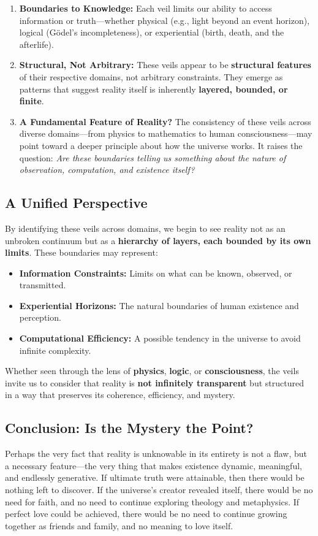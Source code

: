 \documentclass[12pt]{article}
\begin{document}
\begin{enumerate}
    \item \textbf{Boundaries to Knowledge:} Each veil limits our ability to access information or truth—whether physical (e.g., light beyond an event horizon), logical (Gödel’s incompleteness), or experiential (birth, death, and the afterlife).
    \item \textbf{Structural, Not Arbitrary:} These veils appear to be \textbf{structural features} of their respective domains, not arbitrary constraints. They emerge as patterns that suggest reality itself is inherently \textbf{layered, bounded, or finite}.
    \item \textbf{A Fundamental Feature of Reality?} The consistency of these veils across diverse domains—from physics to mathematics to human consciousness—may point toward a deeper principle about how the universe works. It raises the question: \emph{Are these boundaries telling us something about the nature of observation, computation, and existence itself?}
\end{enumerate}

\subsection{A Unified Perspective}

By identifying these veils across domains, we begin to see reality not as an unbroken continuum but as a \textbf{hierarchy of layers, each bounded by its own limits}. These boundaries may represent:
\begin{itemize}
    \item \textbf{Information Constraints:} Limits on what can be known, observed, or transmitted.
    \item \textbf{Experiential Horizons:} The natural boundaries of human existence and perception.
    \item \textbf{Computational Efficiency:} A possible tendency in the universe to avoid infinite complexity.
\end{itemize}

Whether seen through the lens of \textbf{physics}, \textbf{logic}, or \textbf{consciousness}, the veils invite us to consider that reality is \textbf{not infinitely transparent} but structured in a way that preserves its coherence, efficiency, and mystery.

\subsection{Conclusion: Is the Mystery the Point?}
Perhaps the very fact that reality is unknowable in its entirety is not a flaw, but a necessary feature—the very thing that makes existence dynamic, meaningful, and endlessly generative. If ultimate truth were attainable, then there would be nothing left to discover. If the universe's creator revealed itself, there would be no need for faith, and no need to continue exploring theology and metaphysics. If perfect love could be achieved, there would be no need to continue growing together as friends and family, and no meaning to love itself.
\end{document}
